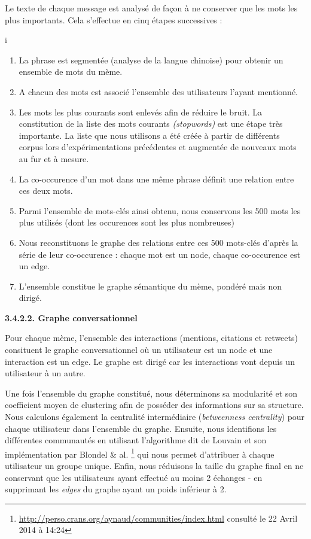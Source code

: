 Le texte de chaque message est analys\'e de fa\c{c}on \`a ne conserver
que les mots les plus importants. Cela s{\textquoteright}effectue en
cinq \'etapes successives : 

i
\begin{enumerate}
\item La phrase est segment\'ee (analyse de la langue chinoise) pour
obtenir un ensemble de mots du m\`eme.
\item A chacun des mots est associ\'e l{\textquoteright}ensemble des
utilisateurs l{\textquoteright}ayant mentionn\'e.
\item Les mots les plus courants sont enlev\'es afin de r\'eduire le
bruit. La constitution de la liste des mots courants
\textit{(stopwords) }est une \'etape tr\`es importante. La liste que
nous utilisons a \'et\'e cr\'e\'ee \`a partir de diff\'erents corpus
lors d{\textquoteright}exp\'erimentations pr\'ec\'edentes et
augment\'ee de nouveaux mots au fur et \`a mesure.
\item La co-occurence d{\textquoteright}un mot dans une m\^eme phrase
d\'efinit une relation entre ces deux mots.
\item Parmi l{\textquoteright}ensemble de mots-cl\'es ainsi obtenu, nous
conservons les 500 mots les plus utilis\'es (dont les occurences sont
les plus nombreuses) 
\item Nous reconstituons le graphe des relations entre ces 500
mots-cl\'es d{\textquoteright}apr\`es la s\'erie de leur co-occurence :
chaque mot est un node, chaque co-occurence est un edge.
\item L{\textquoteright}ensemble constitue le graphe s\'emantique du
m\`eme, pond\'er\'e mais non dirig\'e.
\end{enumerate}
\textbf{3.4.2.2. Graphe conversationnel}

Pour chaque m\`eme, l{\textquoteright}ensemble des interactions
(mentions, citations et retweets) consituent le graphe conversationnel
o\`u un utilisateur est un node et une interaction est un edge. Le
graphe est dirig\'e car les interactions vont depuis un utilisateur \`a
un autre. 

Une fois l{\textquoteright}ensemble du graphe constitu\'e, nous
d\'eterminons sa modularit\'e et son coefficient moyen de clustering
afin de poss\'eder des informations sur sa structure. Nous calculons
\'egalement la centralit\'e interm\'ediaire (\textit{betweenness
centrality}) pour chaque utilisateur dans l{\textquoteright}ensemble du
graphe. Ensuite, nous identifions les diff\'erentes communaut\'es en
utilisant l{\textquoteright}algorithme dit de Louvain et son
impl\'ementation par Blondel \& al. \cite{Blondel2008}\footnote{
\url{http://perso.crans.org/aynaud/communities/index.html} consult\'e
le 22 Avril 2014 \`a 14:24} qui nous permet d{\textquoteright}attribuer
\`a chaque utilisateur un groupe unique. Enfin, nous r\'eduisons la
taille du graphe final en ne conservant que les utilisateurs ayant
effectu\'e au moins 2 \'echanges - en supprimant les \textit{edges} du
graphe ayant un poids inf\'erieur \`a 2.

